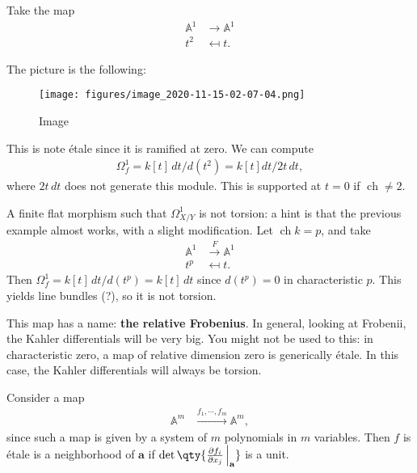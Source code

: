 \begin{example}

Take the map
\begin{align*}  
{\mathbb{A}}^1 &\to {\mathbb{A}}^1 \\
t^2 &\mapsfrom t
.\end{align*}

The picture is the following:

\begin{figure}
\centering
\texttt{[image: figures/image\_2020-11-15-02-07-04.png]}
\caption{Image}
\end{figure}

This is note étale since it is ramified at zero. We can compute
\begin{align*}  
\Omega_f^1 = k[t]\, dt / d(t^2) = k[t] dt/ 2t\, dt
,\end{align*}
where \(2t\,dt\) does not generate this module. This is supported at
\(t=0\) if \(\operatorname{ch}\neq 2\).

\end{example}

\begin{example}[?]

A finite flat morphism such that \(\Omega_{X/Y}^1\) is not torsion: a
hint is that the previous example almost works, with a slight
modification. Let \(\operatorname{ch}k = p\), and take
\begin{align*}  
{\mathbb{A}}^1 &\xrightarrow{F} {\mathbb{A}}^1 \\
t^p &\mapsfrom t
.\end{align*}
Then \(\Omega_f^1 = k[t]\, dt / d(t^p) = k[t]\,dt\) since \(d(t^p) = 0\)
in characteristic \(p\). This yields line bundles (?), so it is not
torsion.

\end{example}

\begin{remark}

This map has a name: \textbf{the relative Frobenius}. In general,
looking at Frobenii, the Kahler differentials will be very big. You
might not be used to this: in characteristic zero, a map of relative
dimension zero is generically étale. In this case, the Kahler
differentials will always be torsion.

\end{remark}

\begin{example}[?]

Consider a map
\begin{align*}  
{\mathbb{A}}^m &\xrightarrow{f_1, \cdots, f_m} {\mathbb{A}}^m
,\end{align*}
since such a map is given by a system of \(m\) polynomials in \(m\)
variables. Then \(f\) is étale is a neighborhood of \(\mathbf{a}\) if
\(\det \qty{{\frac{\partial f_i}{\partial x_j}\,} \Big|_{\mathbf{a}} }\)
is a unit.

\end{example}

